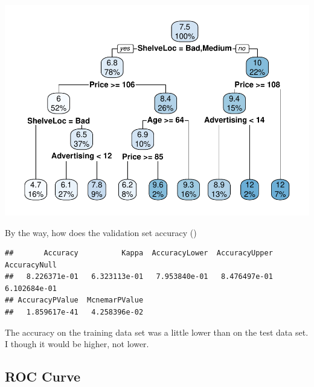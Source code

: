 \documentclass[
]{book}
\newenvironment{Shaded}{\begin{snugshade}}{\end{snugshade}}
\newcommand{\DataTypeTok}[1]{\textcolor[rgb]{0.13,0.29,0.53}{#1}}
\newcommand{\KeywordTok}[1]{\textcolor[rgb]{0.13,0.29,0.53}{\textbf{#1}}}
\newcommand{\NormalTok}[1]{#1}
\newcommand{\OperatorTok}[1]{\textcolor[rgb]{0.81,0.36,0.00}{\textbf{#1}}}
\newcommand{\StringTok}[1]{\textcolor[rgb]{0.31,0.60,0.02}{#1}}
\begin{document}
\includegraphics{data-sci_files/figure-latex/unnamed-chunk-67-1.pdf}

By the way, how does the validation set accuracy ()

\begin{Shaded}
\end{Shaded}

\begin{verbatim}
##       Accuracy          Kappa  AccuracyLower  AccuracyUpper   AccuracyNull 
##   8.226371e-01   6.323113e-01   7.953840e-01   8.476497e-01   6.102684e-01 
## AccuracyPValue  McnemarPValue 
##   1.859617e-41   4.258396e-02
\end{verbatim}

The accuracy on the training data set was a little lower than on the test data set. I though it would be higher, not lower.

\hypertarget{roc-curve}{%
\subsection{ROC Curve}\label{roc-curve}}
\end{document}
